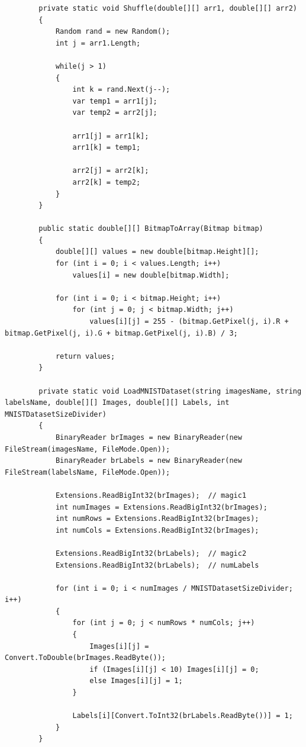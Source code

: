 \documentclass[12pt,a4paper]{article}
\begin{document}
\begin{lstlisting}
        private static void Shuffle(double[][] arr1, double[][] arr2)
        {
            Random rand = new Random();
            int j = arr1.Length;

            while(j > 1)
            {
                int k = rand.Next(j--);
                var temp1 = arr1[j];
                var temp2 = arr2[j];

                arr1[j] = arr1[k];
                arr1[k] = temp1;

                arr2[j] = arr2[k];
                arr2[k] = temp2;
            }
        }

        public static double[][] BitmapToArray(Bitmap bitmap)
        {
            double[][] values = new double[bitmap.Height][];
            for (int i = 0; i < values.Length; i++)
                values[i] = new double[bitmap.Width];

            for (int i = 0; i < bitmap.Height; i++)
                for (int j = 0; j < bitmap.Width; j++)
                    values[i][j] = 255 - (bitmap.GetPixel(j, i).R + bitmap.GetPixel(j, i).G + bitmap.GetPixel(j, i).B) / 3;

            return values;
        }

        private static void LoadMNISTDataset(string imagesName, string labelsName, double[][] Images, double[][] Labels, int MNISTDatasetSizeDivider)
        {
            BinaryReader brImages = new BinaryReader(new FileStream(imagesName, FileMode.Open));
            BinaryReader brLabels = new BinaryReader(new FileStream(labelsName, FileMode.Open));

            Extensions.ReadBigInt32(brImages);  // magic1
            int numImages = Extensions.ReadBigInt32(brImages);
            int numRows = Extensions.ReadBigInt32(brImages);
            int numCols = Extensions.ReadBigInt32(brImages);

            Extensions.ReadBigInt32(brLabels);  // magic2
            Extensions.ReadBigInt32(brLabels);  // numLabels

            for (int i = 0; i < numImages / MNISTDatasetSizeDivider; i++)
            {
                for (int j = 0; j < numRows * numCols; j++)
                {
                    Images[i][j] = Convert.ToDouble(brImages.ReadByte());
                    if (Images[i][j] < 10) Images[i][j] = 0;
                    else Images[i][j] = 1;
                }

                Labels[i][Convert.ToInt32(brLabels.ReadByte())] = 1;
            }
        }


\end{lstlisting}
\end{document}
